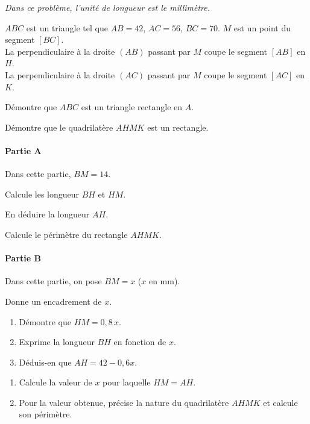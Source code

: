 {\em Dans ce problème, l'unité de longueur est le millimètre.}
\par $ABC$ est un triangle tel que $AB=42$, $AC=56$, $BC=70$. $M$ est
un point du segment $[BC]$.
\\La perpendiculaire à la droite $(AB)$ passant par $M$ coupe le
segment $[AB]$ en $H$.
\\La perpendiculaire à la droite $(AC)$ passant par $M$ coupe le
segment $[AC]$ en $K$.
\begin{myenumerate}
\item Démontre que $ABC$ est un triangle rectangle en $A$.
\item Démontre que le quadrilatère $AHMK$ est un rectangle.
\end{myenumerate}
\par\paragraph{Partie A} Dans cette partie, $BM=14$.
\begin{myenumerate}
\item Calcule les longueur $BH$ et $HM$.
\item En déduire la longueur $AH$.
\item Calcule le périmètre du rectangle $AHMK$.
\end{myenumerate}
\par\paragraph{Partie B} Dans cette partie, on pose $BM=x$ ($x$ en
mm).
\begin{myenumerate}
\item Donne un encadrement de $x$.
\item
\begin{enumerate}
\item Démontre que $HM=0,8\,x$.
\item Exprime la longueur $BH$ en fonction de $x$.
\item Déduis-en que $AH=42-0,6x$.
\end{enumerate}
\item
\begin{enumerate}
\item Calcule la valeur de $x$ pour laquelle $HM=AH$.
\item Pour la valeur obtenue, précise la nature du quadrilatère $AHMK$
et calcule son périmètre.
\end{enumerate}
\end{myenumerate}